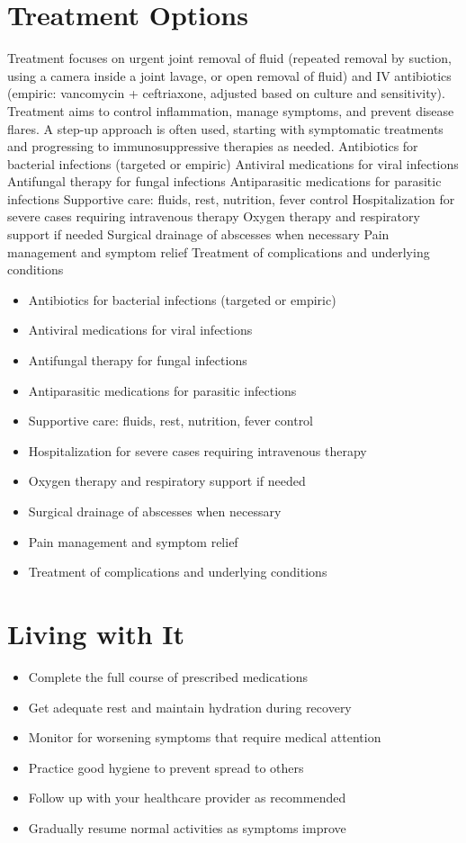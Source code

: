 \section{Treatment Options}
Treatment focuses on urgent joint removal of fluid (repeated removal by suction, using a camera inside a joint lavage, or open removal of fluid) and IV antibiotics (empiric: vancomycin + ceftriaxone, adjusted based on culture and sensitivity). Treatment aims to control inflammation, manage symptoms, and prevent disease flares. A step-up approach is often used, starting with symptomatic treatments and progressing to immunosuppressive therapies as needed. Antibiotics for bacterial infections (targeted or empiric) Antiviral medications for viral infections Antifungal therapy for fungal infections Antiparasitic medications for parasitic infections Supportive care: fluids, rest, nutrition, fever control Hospitalization for severe cases requiring intravenous therapy Oxygen therapy and respiratory support if needed Surgical drainage of abscesses when necessary Pain management and symptom relief Treatment of complications and underlying conditions

\begin{itemize}[noitemsep]
  \item Antibiotics for bacterial infections (targeted or empiric)
  \item Antiviral medications for viral infections
  \item Antifungal therapy for fungal infections
  \item Antiparasitic medications for parasitic infections
  \item Supportive care: fluids, rest, nutrition, fever control
  \item Hospitalization for severe cases requiring intravenous therapy
  \item Oxygen therapy and respiratory support if needed
  \item Surgical drainage of abscesses when necessary
  \item Pain management and symptom relief
  \item Treatment of complications and underlying conditions
\end{itemize}
\section{Living with It}
\begin{itemize}[noitemsep]
  \item Complete the full course of prescribed medications
  \item Get adequate rest and maintain hydration during recovery
  \item Monitor for worsening symptoms that require medical attention
  \item Practice good hygiene to prevent spread to others
  \item Follow up with your healthcare provider as recommended
  \item Gradually resume normal activities as symptoms improve
\end{itemize}
